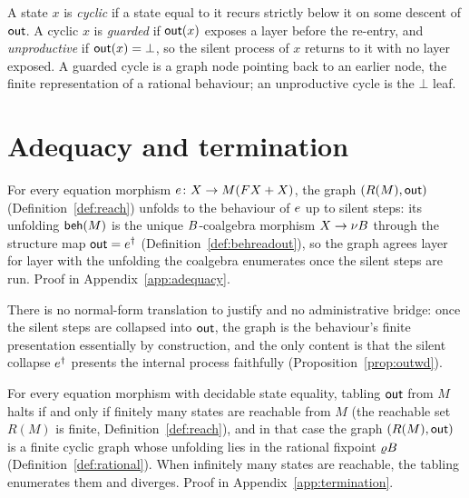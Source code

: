 \begin{definition}\label{def:guarded}
  A state $x$ is \emph{cyclic} if a state equal to it recurs strictly below it on some descent of
  $\mathsf{out}$. A cyclic $x$ is \emph{guarded} if $\mathsf{out}(x)$ exposes a layer before the re-entry, and
  \emph{unproductive} if $\mathsf{out}(x) = \bot$, so the silent process of $x$ returns to it with no layer
  exposed. A guarded cycle is a graph node pointing back to an earlier node, the finite representation of
  a rational behaviour; an unproductive cycle is the $\bot$ leaf.
\end{definition}

\section{Adequacy and termination}\label{sec:adequacy}
\begin{theorem}[Adequacy]\label{thm:adequacy}
  For every equation morphism $e \colon X \to M(F X + X)$, the graph $(R(M),\mathsf{out})$
  (Definition~\ref{def:reach}) unfolds to the behaviour of $e$ up to silent steps: its unfolding
  $\mathsf{beh}(M)$ is the unique $B$-coalgebra morphism $X \to \nu B$ through the structure map
  $\mathsf{out} = e^{\dagger}$ (Definition~\ref{def:behreadout}), so the graph agrees layer for layer with
  the unfolding the coalgebra enumerates once the silent steps are run. Proof in
  Appendix~\ref{app:adequacy}.
\end{theorem}

\noindent
There is no normal-form translation to justify and no administrative bridge: once the silent steps are
collapsed into $\mathsf{out}$, the graph is the behaviour's finite presentation essentially by construction,
and the only content is that the silent collapse $e^{\dagger}$ presents the internal process
faithfully (Proposition~\ref{prop:outwd}).

\begin{theorem}[Termination]\label{thm:termination}
  For every equation morphism with decidable state equality, tabling $\mathsf{out}$ from $M$ halts if and
  only if finitely many states are reachable from $M$ (the reachable set $R(M)$ is finite,
  Definition~\ref{def:reach}), and in that case the graph $(R(M),\mathsf{out})$ is a finite cyclic graph whose
  unfolding lies in the rational fixpoint $\varrho B$ (Definition~\ref{def:rational}). When infinitely
  many states are reachable, the tabling enumerates them and diverges. Proof in
  Appendix~\ref{app:termination}.
\end{theorem}

